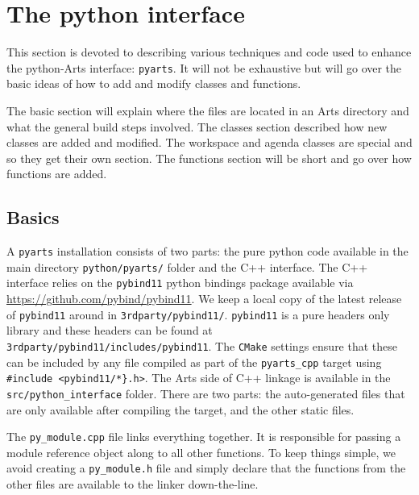 \chapter{The python interface}

This section is devoted to describing various techniques and code used to enhance the python-Arts interface: \verb|pyarts|.
It will not be exhaustive but will go over the basic ideas of how to add and modify classes and functions.

The basic section will explain where the files are located in an Arts directory and what the general build steps involved. 
 The classes section described how new classes are added and modified.  
 The workspace and agenda classes are special and so they get their own section.  
 The functions section will be short and go over how functions are added.

\section{Basics}
A \verb|pyarts| installation consists of two parts: the pure python code available in the main directory \verb|python/pyarts/| folder and the C++ interface.
The C++ interface relies on the \verb|pybind11| python bindings package available via \url{https://github.com/pybind/pybind11}.
We keep a local copy of the latest release of \verb|pybind11| around in \verb|3rdparty/pybind11/|.
\verb|pybind11| is a pure headers only library and these headers can be found at \verb|3rdparty/pybind11/includes/pybind11|.
The \verb|CMake| settings ensure that these can be included by any file compiled as part of the \verb|pyarts_cpp| target using
\verb|#include <pybind11/*}.h>|.
The Arts side of C++ linkage is available in the \verb|src/python_interface| folder.  There are two parts: the auto-generated files
that are only available after compiling the target, and the other static files.

The \verb|py_module.cpp| file links everything together.
It is responsible for passing a module reference object along to all other functions.
To keep things simple, we avoid creating a \verb|py_module.h| file and simply declare
that the functions from the other files are available to the linker down-the-line.

